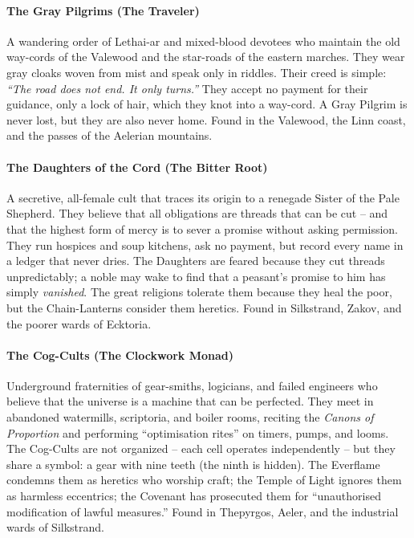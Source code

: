 \paragraph{The Gray Pilgrims (The Traveler)}
A wandering order of Lethai-ar and mixed-blood devotees who maintain the old way-cords of the Valewood and the star-roads of the eastern marches. They wear gray cloaks woven from mist and speak only in riddles. Their creed is simple: \textit{``The road does not end. It only turns.''} They accept no payment for their guidance, only a lock of hair, which they knot into a way-cord. A Gray Pilgrim is never lost, but they are also never home. Found in the Valewood, the Linn coast, and the passes of the Aelerian mountains.

\paragraph{The Daughters of the Cord (The Bitter Root)}
A secretive, all-female cult that traces its origin to a renegade Sister of the Pale Shepherd. They believe that all obligations are threads that can be cut -- and that the highest form of mercy is to sever a promise without asking permission. They run hospices and soup kitchens, ask no payment, but record every name in a ledger that never dries. The Daughters are feared because they cut threads unpredictably; a noble may wake to find that a peasant's promise to him has simply \textit{vanished}. The great religions tolerate them because they heal the poor, but the Chain-Lanterns consider them heretics. Found in Silkstrand, Zakov, and the poorer wards of Ecktoria.

\paragraph{The Cog-Cults (The Clockwork Monad)}
Underground fraternities of gear-smiths, logicians, and failed engineers who believe that the universe is a machine that can be perfected. They meet in abandoned watermills, scriptoria, and boiler rooms, reciting the \textit{Canons of Proportion} and performing ``optimisation rites'' on timers, pumps, and looms. The Cog-Cults are not organized -- each cell operates independently -- but they share a symbol: a gear with nine teeth (the ninth is hidden). The Everflame condemns them as heretics who worship craft; the Temple of Light ignores them as harmless eccentrics; the Covenant has prosecuted them for ``unauthorised modification of lawful measures.'' Found in Thepyrgos, Aeler, and the industrial wards of Silkstrand.

